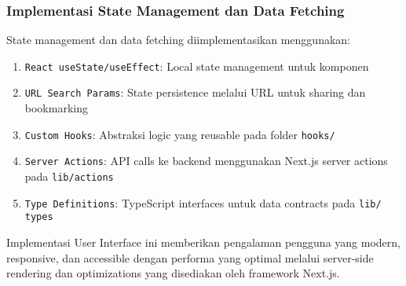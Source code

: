 \subsubsection{Implementasi State Management dan Data Fetching}

State management dan data fetching diimplementasikan menggunakan:

\begin{enumerate}
	\item \texttt{React useState/useEffect}: Local state management untuk komponen
	\item \texttt{URL Search Params}: State persistence melalui URL untuk sharing dan bookmarking
	\item \texttt{Custom Hooks}: Abstraksi logic yang reusable pada folder \texttt{hooks/}
	\item \texttt{Server Actions}: API calls ke backend menggunakan Next.js server actions pada \texttt{lib/actions}
	\item \texttt{Type Definitions}: TypeScript interfaces untuk data contracts pada \texttt{lib/\\types}
\end{enumerate}

Implementasi User Interface ini memberikan pengalaman pengguna yang modern, responsive, dan accessible dengan performa yang optimal melalui server-side rendering dan optimizations yang disediakan oleh framework Next.js.